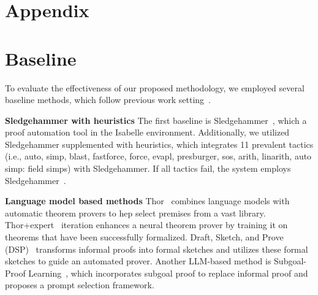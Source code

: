 \documentclass{article} \usepackage{iclr2024_conference,times}
\begin{document}
\nocite{*}



\clearpage

\newpage
\appendix
\section*{\Large{Appendix}}






\section{Baseline}
To evaluate the effectiveness of our proposed methodology, we employed several baseline methods, which follow previous work setting~\citep{jiang2023draft,zhao2023decomposing}.

\textbf{Sledgehammer with heuristics} The first baseline is Sledgehammer~\citep{paulson2010three}, which a proof automation tool in the Isabelle environment. Additionally, we utilized Sledgehammer supplemented with heuristics, which integrates 11 prevalent tactics (i.e., auto, simp, blast, fastforce, force, evapl, presburger, sos, arith, linarith, auto simp: field simps) with Sledgehammer. If all tactics fail, the system employs Sledgehammer~\citep{jiang2023draft}.

\textbf{Language model based methods}  Thor~\citep{jiang2022thor} combines language models with automatic theorem provers to hep select premises from a vast library. Thor+expert~\citep{wu2022autoformalization} iteration enhances a neural theorem prover by training it on theorems that have been successfully formalized. Draft, Sketch, and Prove (DSP)~\citep{jiang2023draft} transforms informal proofs into formal sketches and utilizes these formal sketches to guide an automated prover. Another LLM-based method is Subgoal-Proof Learning~\citep{zhao2023decomposing}, which incorporates subgoal proof to replace informal proof and proposes a prompt selection framework.
\end{document}
